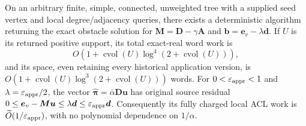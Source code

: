 \begin{theorem}
\label{thm:op3-local-top-tree}
On an arbitrary finite, simple, connected, unweighted tree with a supplied
seed vertex and local degree/adjacency queries, there exists a deterministic
algorithm returning the exact obstacle solution for
$\boldsymbol M=\boldsymbol D-\gamma\boldsymbol A$ and
$\boldsymbol b=\boldsymbol e_v-\lambda\boldsymbol d$.
If $U$ is its returned positive support, its total exact-real word work is
\begin{equation}
 O\!\left(1+\operatorname{cvol}(U)
     \log^4(2+\operatorname{cvol}(U))\right),
 \label{eq:op3-local-top-tree-work}
\end{equation}
and its space, even retaining every historical application version, is
$O(1+\operatorname{cvol}(U)\log^3(2+\operatorname{cvol}(U)))$ words.
For $0<\varepsilon_{\mathrm{appr}}<1$ and $\lambda=\varepsilon_{\mathrm{appr}}/2$, the vector
$\widehat{\boldsymbol\pi}=\bar\alpha\boldsymbol D\boldsymbol u$
has original source residual
$0\leq\boldsymbol e_v-\boldsymbol M\boldsymbol u
 \leq\lambda\boldsymbol d\leq\varepsilon_{\mathrm{appr}}\boldsymbol d$.
Consequently its fully charged local ACL work is
$\widetilde O(1/\varepsilon_{\mathrm{appr}})$, with no polynomial dependence on $1/\alpha$.
\end{theorem}
